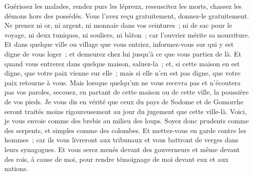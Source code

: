 \begin{multicols}{2}
Guérissez les malades, rendez purs les lépreux, ressuscitez les morts, chassez les démons hors des possédés. Vous l'avez reçu gratuitement, donnez-le gratuitement.
Ne prenez ni or, ni argent, ni monnaie dans vos ceintures~;
ni de sac pour le voyage, ni deux tuniques, ni souliers, ni bâton~; car l'ouvrier mérite sa nourriture.
Et dans quelque ville ou village que vous entriez, informez-vous sur qui y est digne de vous loger~; et demeurez chez lui jusqu'à ce que vous partiez de là.
Et quand vous entrerez dans quelque maison, saluez-la~;
et, si cette maison en est digne, que votre paix vienne sur elle~; mais si elle n'en est pas digne, que votre paix retourne à vous.
Mais lorsque quelqu'un ne vous recevra pas et n'écoutera pas vos paroles, secouez, en partant de cette maison ou de cette ville, la poussière de vos pieds.
Je vous dis en vérité que ceux du pays de Sodome et de Gomorrhe seront traités moins rigoureusement au jour du jugement que cette ville-là.
Voici, je vous envoie comme des brebis au milieu des loups. Soyez donc prudents comme des serpents, et simples comme des colombes.
Et mettez-vous en garde contre les hommes~; car ils vous livreront aux tribunaux et vous battront de verges dans leurs synagogues.
Et vous serez menés devant des gouverneurs et même devant des rois, à cause de moi, pour rendre témoignage de moi devant eux et aux nations.

\end{multicols}
